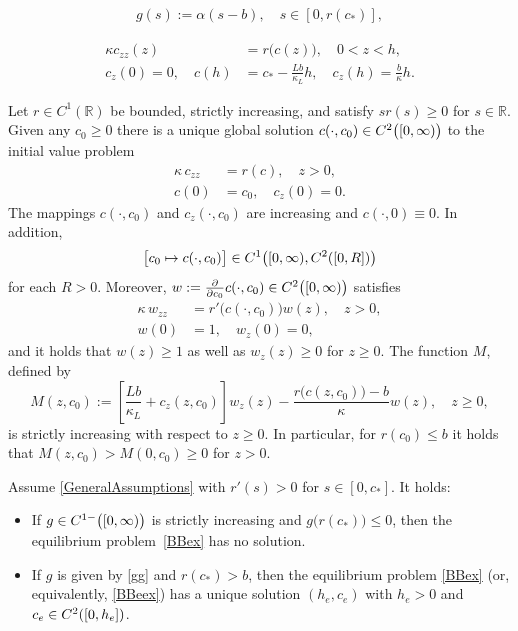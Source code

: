 \documentclass[10pt,a4paper]{amsart}
\begin{document}
\begin{align}\label{gg}
g(s):=\alpha(s-b),\quad s\in [0,r(c_*)],
\end{align}

\begin{subequations}
\label{BBeex}
\begin{align}
\kappa c_{zz}(z)&= r\bigl( c(z)\bigr),\quad 0<z<h,\label{BBeex2}\\
c_z(0)=0,\quad c(h)&=c_*-\frac{L b}{\kappa_L}h,\quad
c_z(h)=\frac{b}{\kappa}h.\label{BBeex4} 
\end{align}
 \end{subequations}

\begin{lem}\label{L10}
Let $r\in C^1(\mathbb{R})$ be bounded, strictly increasing,
and satisfy $s r(s)\ge 0$ for $s\in \mathbb{R}$. Given any
$c_0\ge 0$ there is a unique global solution $c(\cdot,c_0)\in
{\rm C}^2 \bigl( [0,\infty)\bigr) $ to the initial value
problem
\begin{subequations}
\label{c1}
\begin{align}
\kappa\, c_{zz}&= r( c ),\quad z>0,\label{c2}\\
c(0)&=c_0,\quad  c_z(0)=0. \label{c3} 
\end{align}
 \end{subequations}
The mappings $c(\cdot,c_0)$ and $c_z(\cdot,c_0)$ are increasing and
$c(\cdot,0)\equiv 0$. In addition,
$$
\bigl[ c_0\mapsto c(\cdot,c_0)\bigr]
\in{\rm C}^1\bigl([0,\infty),{\rm C}^2([0,R])\bigr)$$
for each $R>0$. Moreover, $w:=\frac{\partial}{\partial c_0} c(\cdot,c_0)\in
{\rm C}^2\bigl([0,\infty)\bigr)$ satisfies
\begin{subequations}
\label{w1}
\begin{align}
\kappa\, w_{zz}&= r'\bigl( c(\cdot,c_0)\bigr) w(z),\quad
z>0,\label{w2}\\  w(0)&=1,\quad w_z(0)=0, \label{w3} 
\end{align}
\end{subequations}
and it holds that $w(z)\ge 1$ as well as $w_z(z)\ge 0$ for $z\ge0$.
The function $M$, defined by
$$
M(z,c_0):=\left[\frac{Lb}{\kappa_L}+c_z(z,c_0)\right]
w_z(z)-\frac{r\bigl( c(z,c_0)\bigr)-b }{\kappa}w(z),\quad z\ge 0,
$$
is strictly increasing with respect to $z\ge 0$. In particular, for $r(c_0)\le b$ it holds
that $M(z,c_0)> M(0,c_0)\ge 0$ for $z> 0$. 
\end{lem}

\begin{prop}\label{P2}
Assume \eqref{GeneralAssumptions} with $r'(s)>0$ for $s\in [0,c_*]$. It holds:
\begin{itemize}
\item[(i)] If $g\in {\rm C}^{1-}\bigl( [0,\infty)\bigr)$ is
  strictly increasing and $g \bigl( r(c_*)\bigr)\leq 0$, then the equilibrium
  problem~\eqref{BBex}  has no solution.
\item[(ii)] If $g$ is given by \eqref{gg} and $r(c_*)> b$, then the
  equilibrium problem \eqref{BBex} (or, equivalently, \eqref{BBeex}) has a unique solution $(h_e,c_e)$ 
  with $h_e>0$  and $c_e\in  {\rm C}^2([0,h_e])$.
\end{itemize}
\end{prop}
\end{document}
